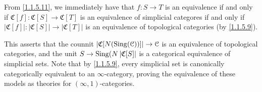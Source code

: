 \begin{remark}\label{1.1.5.12}
	From \cref{1.1.5.11}, we immediately have that $f : S \to T$ is an equivalence if and only if $\mathfrak{C} [f]: \mathfrak{C} [S] \to \mathfrak{C} [T]$ is an equivalence of simplicial categores if and only if $\left| \mathfrak{C} [f] \right| : \left| \mathfrak{C} [S] \right|  \to \left| \mathfrak{C} [T] \right| $ is an equivalence of topological categories (by \cref{1.1.5.9}).
\end{remark}

This asserts that the counnit $\left| \mathfrak{C} [N(\operatorname{Sing}(\mathcal{C}) )] \right| \to \mathcal{C} $ is an equivalence of topological categories, and the unit $S\to \operatorname{Sing}(N\left| \mathfrak{C} [S] \right| $ is a categorical equivalence of simplicial sets. Note that by \cref{1.1.5.9}, every simplicial set is canonically categorically equivalent to an $\infty $-category, proving the equivalence of these models as theories for $(\infty ,1)$-categories.
